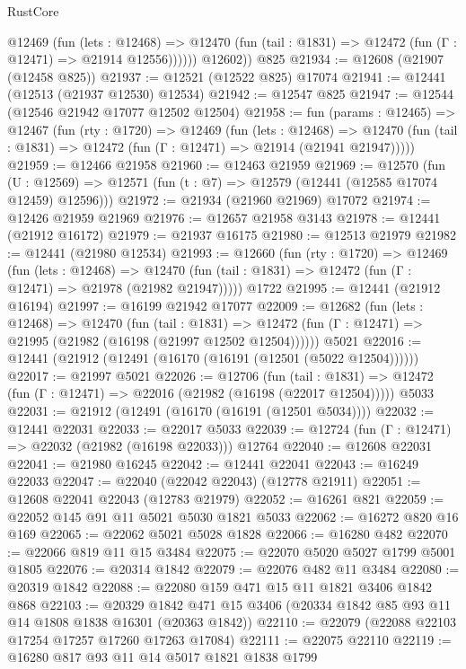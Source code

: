 \begin{lexlean}{RustCore}
\begin{coremodule}
            @12469
              (fun (lets : @12468) =>
              @12470 (fun (tail : @1831) => @12472 (fun (Γ : @12471) => @21914 @12556))))))
        @12602))
    @825
@21934 := @12608 (@21907 (@12458 @825))
@21937 := @12521 (@12522 @825) @17074
@21941 := @12441 (@12513 (@21937 @12530) @12534)
@21942 := @12547 @825
@21947 := @12544 (@12546 @21942 @17077 @12502 @12504)
@21958 := fun (params : @12465) =>
  @12467
    (fun (rty : @1720) =>
    @12469
      (fun (lets : @12468) =>
      @12470 (fun (tail : @1831) => @12472 (fun (Γ : @12471) => @21914 (@21941 @21947)))))
@21959 := @12466 @21958
@21960 := @12463 @21959
@21969 := @12570
    (fun (U : @12569) => @12571 (fun (t : @7) => @12579 (@12441 (@12585 @17074 @12459) @12596)))
@21972 := @21934 (@21960 @21969) @17072
@21974 := @12426 @21959 @21969
@21976 := @12657 @21958 @3143
@21978 := @12441 (@21912 @16172)
@21979 := @21937 @16175
@21980 := @12513 @21979
@21982 := @12441 (@21980 @12534)
@21993 := @12660
    (fun (rty : @1720) =>
    @12469
      (fun (lets : @12468) =>
      @12470 (fun (tail : @1831) => @12472 (fun (Γ : @12471) => @21978 (@21982 @21947)))))
    @1722
@21995 := @12441 (@21912 @16194)
@21997 := @16199 @21942 @17077
@22009 := @12682
    (fun (lets : @12468) =>
    @12470
      (fun (tail : @1831) =>
      @12472 (fun (Γ : @12471) => @21995 (@21982 (@16198 (@21997 @12502 @12504))))))
    @5021
@22016 := @12441 (@21912 (@12491 (@16170 (@16191 (@12501 (@5022 @12504))))))
@22017 := @21997 @5021
@22026 := @12706
    (fun (tail : @1831) => @12472 (fun (Γ : @12471) => @22016 (@21982 (@16198 (@22017 @12504)))))
    @5033
@22031 := @21912 (@12491 (@16170 (@16191 (@12501 @5034))))
@22032 := @12441 @22031
@22033 := @22017 @5033
@22039 := @12724 (fun (Γ : @12471) => @22032 (@21982 (@16198 @22033))) @12764
@22040 := @12608 @22031
@22041 := @21980 @16245
@22042 := @12441 @22041
@22043 := @16249 @22033
@22047 := @22040 (@22042 @22043) (@12778 @21911)
@22051 := @12608 @22041 @22043 (@12783 @21979)
@22052 := @16261 @821
@22059 := @22052 @145 @91 @11 @5021 @5030 @1821 @5033
@22062 := @16272 @820 @16 @169
@22065 := @22062 @5021 @5028 @1828
@22066 := @16280 @482
@22070 := @22066 @819 @11 @15 @3484
@22075 := @22070 @5020 @5027 @1799 @5001 @1805
@22076 := @20314 @1842
@22079 := @22076 @482 @11 @3484
@22080 := @20319 @1842
@22088 := @22080 @159 @471 @15 @11 @1821 @3406 @1842 @868
@22103 := @20329
    @1842
    @471
    @15
    @3406
    (@20334 @1842 @85 @93 @11 @14 @1808 @1838 @16301 (@20363 @1842))
@22110 := @22079 (@22088 @22103 @17254 @17257 @17260 @17263 @17084)
@22111 := @22075 @22110
@22119 := @16280 @817 @93 @11 @14 @5017 @1821 @1838 @1799

\end{coremodule}
\end{lexlean}
